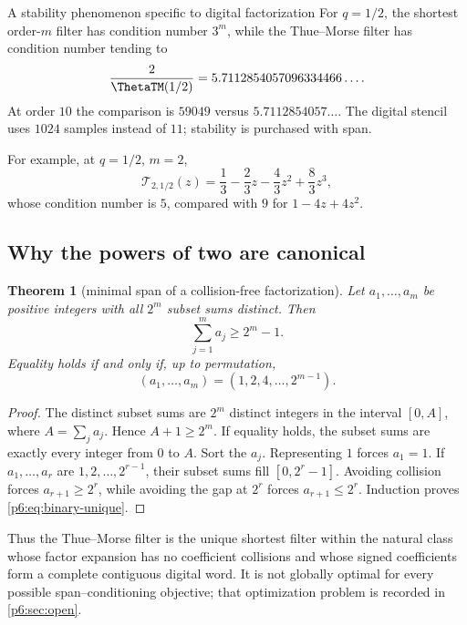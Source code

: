 \documentclass[11pt]{article}
\numberwithin{equation}{section}
\newtheorem{theorem}{Theorem}[section]
\theoremstyle{definition}
\theoremstyle{remark}
\begin{document}
\begin{resultboxPartvv}{A stability phenomenon specific to digital factorization}
For $q=1/2$, the shortest order-$m$ filter has condition number $3^m$, while the
Thue--Morse filter has condition number tending to
\[
 \frac{2}{\ThetaTM(1/2)}
 =5.7112854057096334466\ldots.
\]
At order $10$ the comparison is $59049$ versus $5.7112854057\ldots$.  The digital
stencil uses $1024$ samples instead of $11$; stability is purchased with span.
\end{resultboxPartvv}

For example, at $q=1/2$, $m=2$,
\begin{equation}
 \mathcal T_{2,1/2}(z)
 =\frac13-\frac23z-\frac43z^2+\frac83z^3,
 \label{p6:eq:tm-order2}
\end{equation}
whose condition number is $5$, compared with $9$ for $1-4z+4z^2$.

\subsection{Why the powers of two are canonical}

\begin{theorem}[minimal span of a collision-free factorization]
\label{p6:thm:minimal-binary-span}
Let $a_1,\ldots,a_m$ be positive integers with all $2^m$ subset sums distinct.  Then
\begin{equation}
 \sum_{j=1}^{m}a_j\ge2^m-1.
 \label{p6:eq:subset-span-bound}
\end{equation}
Equality holds if and only if, up to permutation,
\begin{equation}
 (a_1,\ldots,a_m)=(1,2,4,\ldots,2^{m-1}).
 \label{p6:eq:binary-unique}
\end{equation}
\end{theorem}

\begin{proof}
The distinct subset sums are $2^m$ distinct integers in the interval
$[0,A]$, where $A=\sum_ja_j$.  Hence $A+1\ge2^m$.  If equality holds, the subset
sums are exactly every integer from $0$ to $A$.  Sort the $a_j$.  Representing $1$
forces $a_1=1$.  If $a_1,\ldots,a_r$ are $1,2,\ldots,2^{r-1}$, their subset sums fill
$[0,2^r-1]$.  Avoiding collision forces $a_{r+1}\ge2^r$, while avoiding the gap at
$2^r$ forces $a_{r+1}\le2^r$.  Induction proves \eqref{p6:eq:binary-unique}.
\end{proof}

Thus the Thue--Morse filter is the unique shortest filter within the natural class whose
factor expansion has no coefficient collisions and whose signed coefficients form a
complete contiguous digital word.  It is not globally optimal for every possible
span--conditioning objective; that optimization problem is recorded in
\cref{p6:sec:open}.
\end{document}

